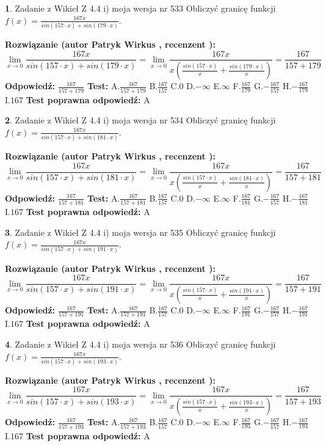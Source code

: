 \documentclass[12pt, a4paper]{article}
\theoremstyle{definition} %
\newtheorem{zad}{}
\newcommand{\zadStart}[1]{\begin{zad}#1\newline}
\newcommand{\zadStop}{\end{zad}}
\newcommand{\rozwStart}[2]{\noindent \textbf{Rozwiązanie (autor #1 , recenzent #2): }\newline}
\newcommand{\rozwStop}{\newline}
\newcommand{\odpStart}{\noindent \textbf{Odpowiedź:}\newline}
\newcommand{\odpStop}{\newline}
\newcommand{\testStart}{\noindent \textbf{Test:}\newline}
\newcommand{\testStop}{\newline}
\newcommand{\kluczStart}{\noindent \textbf{Test poprawna odpowiedź:}\newline}
\newcommand{\kluczStop}{\newline}
\begin{document}
\zadStart{Zadanie z Wikieł Z 4.4 i) moja wersja nr 533}
Obliczyć granicę funkcji $f(x)=\frac{167x}{sin(157\cdot x) +sin(179\cdot x)}$.
\zadStop
\rozwStart{Patryk Wirkus}{}
$$\lim\limits_{x\to 0}\frac{167x}{sin(157\cdot x) +sin(179\cdot x)}=\lim\limits_{x\to 0}\frac{167x}{x(\frac{sin(157\cdot x)}{x}+\frac{sin(179\cdot x)}{x})}=\frac{167}{157+179}$$
\rozwStop
\odpStart
$\frac{167}{157+179}$
\odpStop
\testStart
A.$\frac{167}{157+179}$
B.$\frac{167}{157}$
C.$0$
D.$-\infty$
E.$\infty$
F.$\frac{167}{179}$
G.$-\frac{167}{157}$
H.$-\frac{167}{179}$
I.$167$
\testStop
\kluczStart
A
\kluczStop



\zadStart{Zadanie z Wikieł Z 4.4 i) moja wersja nr 534}
Obliczyć granicę funkcji $f(x)=\frac{167x}{sin(157\cdot x) +sin(181\cdot x)}$.
\zadStop
\rozwStart{Patryk Wirkus}{}
$$\lim\limits_{x\to 0}\frac{167x}{sin(157\cdot x) +sin(181\cdot x)}=\lim\limits_{x\to 0}\frac{167x}{x(\frac{sin(157\cdot x)}{x}+\frac{sin(181\cdot x)}{x})}=\frac{167}{157+181}$$
\rozwStop
\odpStart
$\frac{167}{157+181}$
\odpStop
\testStart
A.$\frac{167}{157+181}$
B.$\frac{167}{157}$
C.$0$
D.$-\infty$
E.$\infty$
F.$\frac{167}{181}$
G.$-\frac{167}{157}$
H.$-\frac{167}{181}$
I.$167$
\testStop
\kluczStart
A
\kluczStop



\zadStart{Zadanie z Wikieł Z 4.4 i) moja wersja nr 535}
Obliczyć granicę funkcji $f(x)=\frac{167x}{sin(157\cdot x) +sin(191\cdot x)}$.
\zadStop
\rozwStart{Patryk Wirkus}{}
$$\lim\limits_{x\to 0}\frac{167x}{sin(157\cdot x) +sin(191\cdot x)}=\lim\limits_{x\to 0}\frac{167x}{x(\frac{sin(157\cdot x)}{x}+\frac{sin(191\cdot x)}{x})}=\frac{167}{157+191}$$
\rozwStop
\odpStart
$\frac{167}{157+191}$
\odpStop
\testStart
A.$\frac{167}{157+191}$
B.$\frac{167}{157}$
C.$0$
D.$-\infty$
E.$\infty$
F.$\frac{167}{191}$
G.$-\frac{167}{157}$
H.$-\frac{167}{191}$
I.$167$
\testStop
\kluczStart
A
\kluczStop



\zadStart{Zadanie z Wikieł Z 4.4 i) moja wersja nr 536}
Obliczyć granicę funkcji $f(x)=\frac{167x}{sin(157\cdot x) +sin(193\cdot x)}$.
\zadStop
\rozwStart{Patryk Wirkus}{}
$$\lim\limits_{x\to 0}\frac{167x}{sin(157\cdot x) +sin(193\cdot x)}=\lim\limits_{x\to 0}\frac{167x}{x(\frac{sin(157\cdot x)}{x}+\frac{sin(193\cdot x)}{x})}=\frac{167}{157+193}$$
\rozwStop
\odpStart
$\frac{167}{157+193}$
\odpStop
\testStart
A.$\frac{167}{157+193}$
B.$\frac{167}{157}$
C.$0$
D.$-\infty$
E.$\infty$
F.$\frac{167}{193}$
G.$-\frac{167}{157}$
H.$-\frac{167}{193}$
I.$167$
\testStop
\kluczStart
A
\kluczStop
\end{document}
